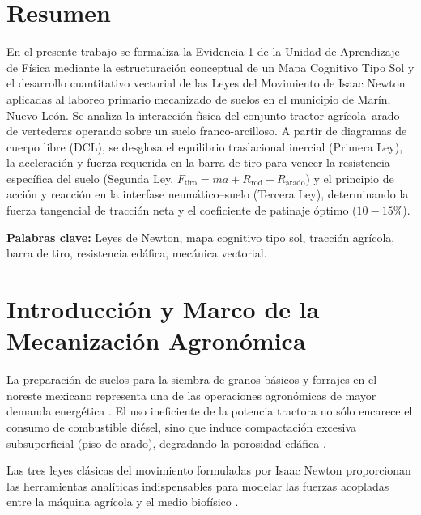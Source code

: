 \documentclass[spanish,letterpaper,oneside]{article}
\begin{document}
\hypersetup{pageanchor=false}
\begingroup
\fontsize{14}{17}\selectfont
\renewcommand{\Huge}{\fontsize{14}{17}\selectfont\bfseries}
\renewcommand{\large}{\fontsize{14}{17}\selectfont}
\templatePortrait
\clearpage
\endgroup
\hypersetup{pageanchor=true}
\templatePagecfg
\singlespacing
\setlength{\tabcolsep}{8pt}
\renewcommand{\arraystretch}{1.18}

\section*{Resumen}
En el presente trabajo se formaliza la Evidencia 1 de la Unidad de Aprendizaje de Física mediante la estructuración conceptual de un Mapa Cognitivo Tipo Sol y el desarrollo cuantitativo vectorial de las Leyes del Movimiento de Isaac Newton aplicadas al laboreo primario mecanizado de suelos en el municipio de Marín, Nuevo León. Se analiza la interacción física del conjunto tractor agrícola--arado de vertederas operando sobre un suelo franco-arcilloso. A partir de diagramas de cuerpo libre (DCL), se desglosa el equilibrio traslacional inercial (Primera Ley), la aceleración y fuerza requerida en la barra de tiro para vencer la resistencia específica del suelo (Segunda Ley, $F_{\text{tiro}} = m a + R_{\text{rod}} + R_{\text{arado}}$) y el principio de acción y reacción en la interfase neumático--suelo (Tercera Ley), determinando la fuerza tangencial de tracción neta y el coeficiente de patinaje óptimo ($10-15\%$).

\vspace{0.4cm}
\noindent\textbf{Palabras clave:} Leyes de Newton, mapa cognitivo tipo sol, tracción agrícola, barra de tiro, resistencia edáfica, mecánica vectorial.

\section{Introducción y Marco de la Mecanización Agronómica}
La preparación de suelos para la siembra de granos básicos y forrajes en el noreste mexicano representa una de las operaciones agronómicas de mayor demanda energética \parencite{serway2018}. El uso ineficiente de la potencia tractora no sólo encarece el consumo de combustible diésel, sino que induce compactación excesiva subsuperficial (piso de arado), degradando la porosidad edáfica \parencite{giancoli2008}.

Las tres leyes clásicas del movimiento formuladas por Isaac Newton proporcionan las herramientas analíticas indispensables para modelar las fuerzas acopladas entre la máquina agrícola y el medio biofísico \parencite{tipler2010}.
\end{document}
